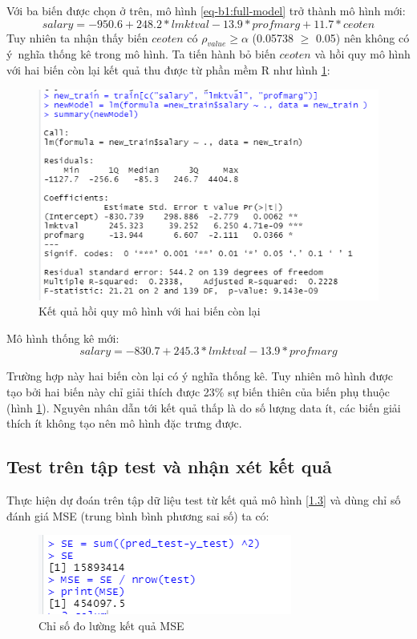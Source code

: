 Với ba biến được chọn ở trên, mô hình \ref{eq-b1:full-model} trở thành mô hình mới:
\begin{equation}\label{1.2}
\textit{salary} = -950.6 + 248.2 * \textit{lmktval} - 13.9 *\textit{profmarg} + 11.7  *\textit{ceoten}
\end{equation}
Tuy nhiên ta nhận thấy biến $\textit{ceoten}$ có $\rho_{value} \ge \alpha$ (0.05738 $\ge$ 0.05) nên không có ý~nghĩa thống kê trong mô hình. Ta tiến hành bỏ biến $\textit{ceoten}$ và hồi quy mô hình với hai biến còn lại kết quả thu được từ phần mềm R như hình \ref{fig-b1:new-summary}:

\begin{figure}[H]
	\centering
	\includegraphics[width=.7\linewidth]{../Photo Of Result/B1_newsummary.PNG}  
	\caption{Kết quả hồi quy mô hình với hai biến còn lại}
	\label{fig-b1:new-summary}
\end{figure}

Mô hình thống kê mới:
\begin{equation}\label{1.3}
\textit{salary} = -830.7 + 245.3 *\textit{lmktval} -13.9 *\textit{profmarg}
\end{equation}

Trường hợp này hai biến còn lại có ý nghĩa thống kê. Tuy nhiên mô hình được tạo bởi hai biến này chỉ giải thích được 23$\%$ sự biến thiên của biến phụ thuộc (hình \ref{fig-b1:new-summary}). Nguyên nhân dẫn tới kết quả thấp là do số lượng data ít, các biến giải thích ít không tạo nên mô hình đặc trưng được.

\subsection*{Test trên tập test và nhận xét kết quả}

Thực hiện dự đoán trên tập dữ liệu test từ kết quả mô hình \ref{1.3} và dùng chỉ số đánh giá MSE (trung bình bình phương sai số) ta có:

\begin{figure}[H]
	\centering
	\includegraphics[width=.5\linewidth]{../Photo Of Result/B1_MSE.PNG}  
	\caption{Chỉ số đo lường kết quả MSE}
	\label{fig-b1:mse}
\end{figure}
